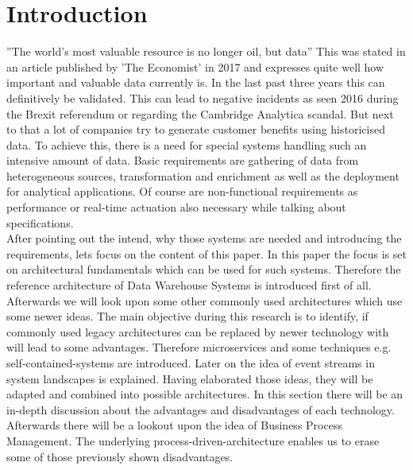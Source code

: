 \section{Introduction}
\label{sec:intro}
''The world’s most valuable resource is no longer oil, but data'' \cite{dataIsOil}\newline
This was stated in an article published by 'The Economist' in 2017 and expresses quite well how important and valuable data currently is. In the last past three years this can definitively be validated. This can lead to negative incidents as seen 2016 during the Brexit referendum or regarding the Cambridge Analytica scandal. But next to that a lot of companies try to generate customer benefits using historicised data.\newline
To achieve this, there is a need for special systems handling such an intensive amount of data. Basic requirements are gathering of data from heterogeneous sources, transformation and enrichment as well as the deployment for analytical applications. Of course are non-functional requirements as performance or real-time actuation also necessary while talking about specifications.\newline
\\
After pointing out the intend, why those systems are needed and introducing the requirements, lets focus on the content of this paper.\newline 
In this paper the focus is set on architectural fundamentals which can be used for such systems. Therefore the reference architecture of Data Warehouse Systems is introduced first of all. Afterwards we will look upon some other commonly used architectures which use some newer ideas.
The main objective during this research is to identify, if commonly used legacy architectures can be replaced by newer technology with will lead to some advantages.
\newline
Therefore microservices and some techniques e.g. self-contained-systems are introduced. Later on the idea of event streams in system landscapes is explained.\newline
Having elaborated those ideas, they will be adapted and combined into possible architectures. In this section there will be an in-depth discussion about the advantages and disadvantages of each technology.\newline
Afterwards there will be a lookout upon the idea of Business Process Management. The underlying process-driven-architecture enables us to erase some of those previously shown disadvantages.\newline
